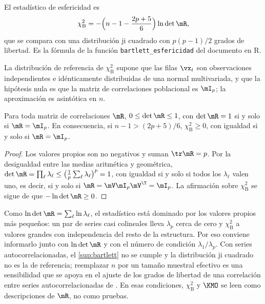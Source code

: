 \begin{definicion}\label{def:bartlett}
El estadístico de esfericidad es
\begin{equation}\label{eq:bartlett}
  \chi^2_{\mathrm B}=-\Bigl(n-1-\frac{2p+5}{6}\Bigr)\ln\det\mR ,
\end{equation}
que se compara con una distribución ji cuadrado con $p(p-1)/2$ grados de libertad. Es la fórmula
de la función \texttt{bartlett\_esfericidad} del documento en R.
\end{definicion}

\begin{supuesto}\label{sup:bartlett}
La distribución de referencia de $\chi^2_{\mathrm B}$ supone que las filas $\vx_t$ son
observaciones independientes e idénticamente distribuidas de una normal multivariada, y que la
hipótesis nula es que la matriz de correlaciones poblacional es $\mI_p$; la aproximación es
asintótica en $n$.
\end{supuesto}

\begin{lema}\label{lem:det}
Para toda matriz de correlaciones $\mR$, $0\le\det\mR\le1$, con $\det\mR=1$ si y solo si
$\mR=\mI_p$. En consecuencia, si $n-1>(2p+5)/6$, $\chi^2_{\mathrm B}\ge0$, con igualdad si y
solo si $\mR=\mI_p$.
\end{lema}

\begin{proof}
Los valores propios son no negativos y suman $\tr\mR=p$. Por la desigualdad entre las medias
aritmética y geométrica, $\det\mR=\prod_\ell\lambda_\ell\le\bigl(\frac1p\sum_\ell\lambda_\ell
\bigr)^p=1$, con igualdad si y solo si todos los $\lambda_\ell$ valen uno, es decir, si y solo si
$\mR=\mV\mI_p\mV^{\T}=\mI_p$. La afirmación sobre $\chi^2_{\mathrm B}$ se sigue de que
$-\ln\det\mR\ge0$.
\end{proof}

\begin{observacion}\label{obs:bartlett-series}
Como $\ln\det\mR=\sum_\ell\ln\lambda_\ell$, el estadístico está dominado por los valores propios
más pequeños: un par de series casi colineales lleva $\lambda_p$ cerca de cero y
$\chi^2_{\mathrm B}$ a valores grandes con independencia del resto de la estructura. Por eso
conviene informarlo junto con $\ln\det\mR$ y con el número de condición
$\lambda_1/\lambda_p$. Con series autocorrelacionadas, el \cref{sup:bartlett} no se cumple y la
distribución ji cuadrado no es la de referencia; reemplazar $n$ por un tamaño muestral efectivo
es una sensibilidad que se apoya en el ajuste de los grados de libertad de una correlación entre
series autocorrelacionadas de \textcite{pyper_peterman_1998}. En esas condiciones,
$\chi^2_{\mathrm B}$ y $\KMO$ se leen como descripciones de $\mR$, no como pruebas.
\end{observacion}

